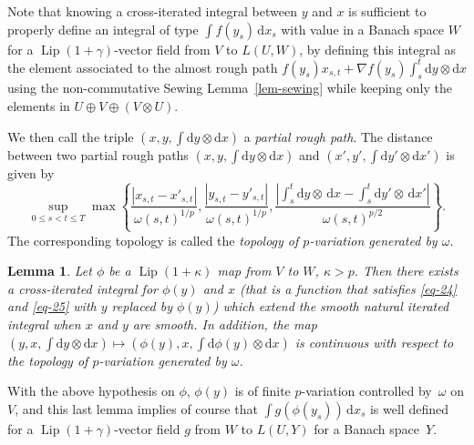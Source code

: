 \documentclass[a4paper,12pt]{article}
\newtheorem{lemma}[theorem]{Lemma}
\theoremstyle{definition}
\newcommand{\vd}{\,\mathrm{d}}
\newcommand{\dd}{\mathrm{d}}
\DeclareMathOperator{\Lip}{Lip}
\begin{document}
Note that knowing a cross-iterated integral between $y$ and $x$ is sufficient to properly define an 
integral of type $\int f(y_s)\vd x_s$ with value in a Banach space $W$
for a $\Lip(1+\gamma)$-vector field from $V$ to $L(U,W)$,
by defining this integral as the element associated
to the almost rough path $f(y_s)x_{s,t}+\nabla f(y_s)\int_s^t \dd y\otimes\dd x$
using the non-commutative Sewing Lemma~\ref{lem-sewing} while keeping only the 
elements in $U\oplus V\oplus (V\otimes U)$.

We then call the triple $\left(x,y,\int \dd y\otimes\dd x\right)$
a \emph{partial rough path}. The distance between two partial rough paths 
$\left(x,y,\int \dd y\otimes\dd x\right)$ and 
$\left(x',y',\int \dd y'\otimes\dd x'\right)$ 
is given by 
\begin{equation*}
\sup_{0\leq s<t\leq T}
\max\left\{\frac{|x_{s,t}-x'_{s,t}|}{\omega(s,t)^{1/p}},
\frac{|y_{s,t}-y'_{s,t}|}{\omega(s,t)^{1/p}},
\frac{\left|\int_s^t \dd y\otimes\vd x-\int_s^t \dd y'\otimes\vd x'\right|}{\omega(s,t)^{p/2}}\right\}.
\end{equation*}
The corresponding topology is called the \emph{topology of $p$-variation generated by $\omega$}.

\begin{lemma}
\label{lem-3}
Let $\phi$ be a $\Lip(1+\kappa)$ map from $V$ to $W$, $\kappa>p$.
Then there exists a cross-iterated integral for $\phi(y)$ 
and $x$ (that is a function that satisfies \eqref{eq-24}
and \eqref{eq-25} with $y$ replaced by $\phi(y)$) which 
extend the smooth  natural iterated integral when $x$ and $y$ are smooth.
In addition, the map $\left(y,x,\int \dd y\otimes\dd x\right)
\mapsto \left(\phi(y),x,\int \dd\phi(y)\otimes\dd x\right)$
is continuous with respect to the topology of $p$-variation generated by $\omega$.
\end{lemma}

With the above hypothesis on $\phi$, 
$\phi(y)$ is of finite $p$-variation controlled by~$\omega$
on $V$, and 
this last lemma implies of course that $\int g(\phi(y_s))\vd x_s$
is well defined for a $\Lip(1+\gamma)$-vector field $g$ from $W$ to $L(U,Y)$ for a Banach space~$Y$.
\end{document}
